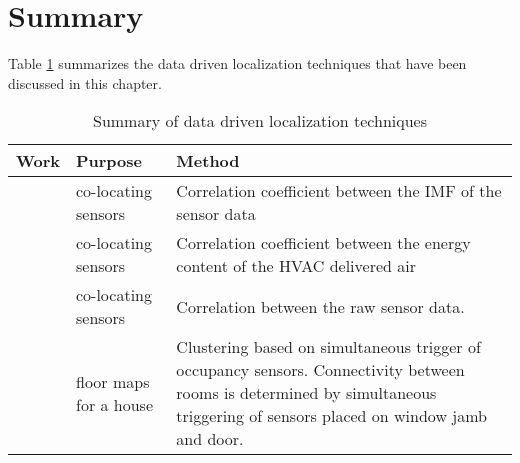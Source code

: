 \section{Summary}
Table \ref{tab:litReview} summarizes the data driven localization techniques that have been discussed in this chapter.
\begin{table}[!ht]
\centering
\caption{Summary of data driven localization techniques}
\label{tab:litReview}
\begin{tabularx}{\textwidth}{|X|X|X|}
\hline
Work                                                                               & Purpose                                                                                                     & Method                                                                                                                                                                                                                              \\ \hline
\centering\text{\citeauthor{Hong:2013:TAS:2528282.2528302}}\text{\cite{Hong:2013:TAS:2528282.2528302}} & co-locating sensors                                                                                         & Correlation coefficient between the IMF of the sensor data \\ \hline
\centering\text{\citeauthor{doi:10.1061/9780784413616.226}}\text{\cite{doi:10.1061/9780784413616.226}} & co-locating sensors                                                                                         & Correlation coefficient between the energy content of the HVAC delivered air \\ \hline
\centering\text{\citeauthor{Koc:2014:CLC:2674061.2674075}}\text{\cite{Koc:2014:CLC:2674061.2674075}}      & co-locating sensors                                                                                         & Correlation between the raw sensor data.                                                                                                                                                                                            \\ \hline
\centering\text{\citeauthor{Lu:2014:SBS:2648771.2629441}}\text{\cite{Lu:2014:SBS:2648771.2629441}}      & floor maps for a house                                                                                      & Clustering based on simultaneous trigger of occupancy sensors. Connectivity between rooms is determined by  simultaneous triggering of sensors placed on window jamb and door. \\ \hline

\end{tabularx}
\end{table}
